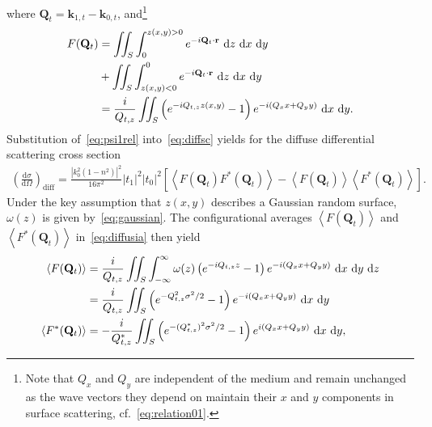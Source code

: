 \documentclass[10pt,twoside, b5paper,pdftex]{report}
\newcommand{\lik}[0]{\ensuremath{&=}}
\newcommand{\E}[1]{\left\langle #1 \right\rangle}
\begin{document}
where $\mathbf{Q}_t = \mathbf{k}_{1,t}-\mathbf{k}_{0,t}$, and\footnote{Note that $Q_x$ and $Q_y$ are independent of the medium and remain unchanged as the wave vectors they depend on maintain their $x$ and $y$ components in surface scattering, cf.~\cref{eq:relation01}.}
\begin{align}
    F(\mathbf{Q}_{t}) \lik \iint_{S}\int_{0}^{z\left(x,y\right)>0} e^{-i\mathbf{Q}_t\cdot\mathbf{r}}\mbox{~d}z \mbox{~d}x \mbox{~d}y \notag \\
    &+ \iint_{S}\int_{z\left(x,y\right)<0}^{0} e^{-i\mathbf{Q}_t\cdot\mathbf{r}} \mbox{~d}z \mbox{~d}x \mbox{~d}y \notag \\	   
    \lik \frac{i}{Q_{t,z}}\iint_{S} \left(e^{-i Q_{t,z}z\left(x,y\right)}-1\right)e^{-i\left(Q_{x}x+Q_{y}y\right)}\mbox{~d}x \mbox{~d}y .
\end{align}
Substitution of~\cref{eq:psi1rel} into~\cref{eq:diffsc} yields for the diffuse differential scattering cross section 
\begin{align}
	\left(\frac{\mbox{d}\sigma}{\mbox{d}\Omega}\right)_{\mbox{diff}} = \frac{\left|k_{0}^{2}(1-n^{2})\right|^2}{16\pi^{2}} |t_{1}|^2|t_{0}|^2 \left[\E{F(\mathbf{Q}_{t})F^{*}(\mathbf{Q}_{t})} - \E{F(\mathbf{Q}_{t})}\E{F^{*}(\mathbf{Q}_{t})}\right]. \label{eq:diffusia}
\end{align}
Under the key assumption that $z(x,y)$ describes a  Gaussian random surface,  $\omega\left(z\right)$ is given by~\cref{eq:gaussian}. The configurational averages $\E{F(\mathbf{Q}_{t})}$ and  $\E{F^{*}(\mathbf{Q}_{t})}$ in~\cref{eq:diffusia} then yield
\begin{align}
	\E{F(\mathbf{Q}_{t})} \lik \frac{i}{Q_{t,z}}\iint_{S} \int^{\infty}_{-\infty} \omega(z) \left(e^{-i Q_{t,z} z }-1\right)e^{-i\left(Q_{x}x+Q_{y}y\right)}\mbox{~d}x \mbox{~d}y \mbox{~d}z \notag \\
	\lik \frac{i}{Q_{t,z}}\iint_{S}   \left(e^{-Q_{t,z}^{2} \sigma^{2}/2 }-1\right)e^{-i\left(Q_{x}x+Q_{y}y\right)}\mbox{~d}x \mbox{~d}y \\
	\E{F^{*}(\mathbf{Q}_{t})} \lik -\frac{i}{Q^{*}_{t,z}}\iint_{S}   \left(e^{-(Q_{t,z}^{*})^{2} \sigma^{2}/2 }-1\right)e^{i\left(Q_{x}x+Q_{y}y\right)}\mbox{~d}x \mbox{~d}y ,\\
\end{align} 
\end{document}
